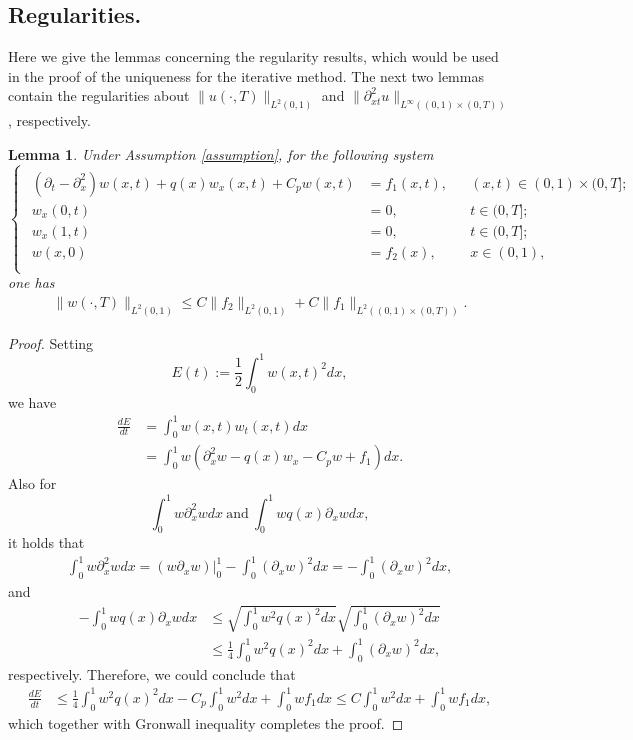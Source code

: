 \documentclass[11pt]{article}
\newtheorem{lemma}{Lemma}[section]
\numberwithin{equation}{section}
\begin{document}
\subsection{Regularities.}

Here we give the lemmas concerning the regularity results, which would be used in the proof of the uniqueness for the iterative method. The next two lemmas contain the regularities about $\|u(\cdot,T)\|_{L^2(0,1)}$ and $\|\partial ^2_{xt}u\|_{L^\infty((0,1)\times(0,T))}$, respectively.  
\begin{lemma}\label{lemma_regularity_parabolic}
Under Assumption \ref{assumption}, for the following system
\begin{equation*}
 \begin{cases}
  \begin{aligned}
   (\partial_t-\partial_x^2)w(x,t)+ q(x)w_x(x,t)+C_pw(x,t)&=f_1(x,t), &&(x,t)\in(0,1)\times(0,T];\\
   w_x(0,t)&=0,&&t\in(0,T];\\
   w_x(1,t)&=0,&&t\in(0,T];\\
   w(x,0)&=f_2(x),&&x\in(0,1),\\
  \end{aligned}
 \end{cases}
\end{equation*}
one has
\begin{equation}
\begin{aligned}\nonumber
\|w(\cdot,T)\|_{L^2(0,1)}\leq C\|f_2\|_{L^2(0,1)}+ C\|f_1\|_{L^2((0,1)\times(0,T))}.   
\end{aligned}
\end{equation}
\end{lemma}

\begin{proof}
Setting 
$$E(t):=\frac{1}{2}\int_0^1w(x,t)^2dx,$$ 
we have 
\begin{align*}
\frac{dE}{dt}
&=\int_0^1w(x,t)w_t(x,t)dx\\
&=\int_0^1w(\partial_x^2w-q(x)w_x-C_pw+f_1)dx.
\end{align*} 
Also for 
$$\int_0^1w\partial_x^2wdx\ \text{and}\ \int_0^1wq(x)\partial_xwdx,$$ 
it holds that
\begin{align*}
\int_0^1w\partial_x^2wdx=(w\partial_xw)|_0^1-\int_0^1(\partial_xw)^2dx=-\int_0^1(\partial_xw)^2dx,
\end{align*} 
and
\begin{align*}
-\int_0^1wq(x)\partial_xwdx
&\leq \sqrt{\int_0^1w^2q(x)^2dx}\sqrt{\int_0^1(\partial_xw)^2dx}\\
&\leq \frac14\int_0^1w^2q(x)^2dx+\int_0^1(\partial_xw)^2dx,
\end{align*} 
respectively. Therefore, we could conclude that 
\begin{align*}
\frac{dE}{dt}
&\leq \frac14\int_0^1w^2q(x)^2dx-C_p\int_0^1w^2dx+\int_0^1wf_1dx\leq C\int_0^1w^2dx+\int_0^1wf_1dx,
\end{align*} 
which together with Gronwall inequality completes the proof.
\end{proof}
\end{document}
